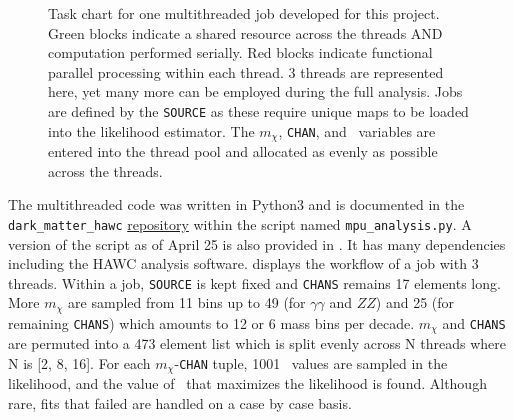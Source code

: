\begin{figure}[h]
    \caption{Task chart for one multithreaded job developed for this project. Green blocks indicate a shared resource across the threads AND computation performed serially. Red blocks indicate functional parallel processing within each thread. 3 threads are represented here, yet many more can be employed during the full analysis. Jobs are defined by the \texttt{SOURCE} as these require unique maps to be loaded into the likelihood estimator. The $m_\chi$, \texttt{CHAN}, and \sv~variables are entered into the thread pool and allocated as evenly as possible across the threads.}
    \label{fig:mtd_multithreads}
\end{figure}

The multithreaded code was written in Python3 and is documented in the \texttt{dark\_matter\_hawc} \href{https://gitlab.com/hawc-observatory/sandboxes/salaza82/dark\_matter\_hawc}{repository} within the script named \texttt{mpu\_analysis.py}.
A version of the script as of April 25  is also provided in .
It has many dependencies including the HAWC analysis software.
 displays the workflow of a job with 3 threads.
Within a job, \texttt{SOURCE} is kept fixed and \texttt{CHANS} remains 17 elements long.
More $m_\chi$ are sampled from 11 bins up to 49 (for $\gamma\gamma$ and $ZZ$) and 25 (for remaining \texttt{CHANS}) which amounts to 12 or 6 mass bins per decade.
$m_\chi$ and \texttt{CHANS} are permuted into a 473 element list which is split evenly across N threads where N is [2, 8, 16].
For each $m_\chi$-\texttt{CHAN} tuple, 1001 \sv~values are sampled in the likelihood, and the value of \sv~that maximizes the likelihood is found.
Although rare, fits that failed are handled on a case by case basis.

